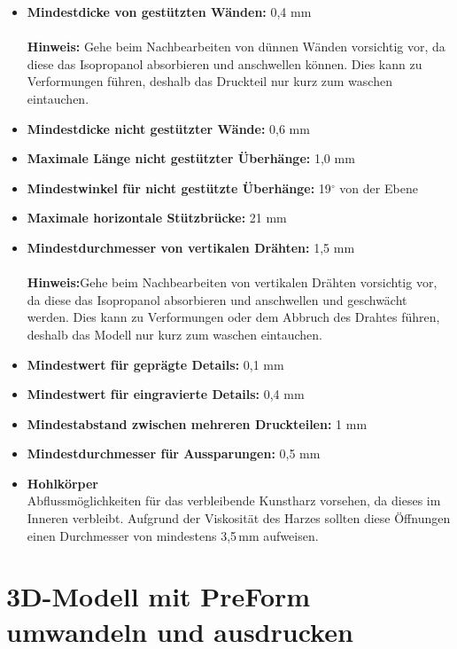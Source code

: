 \documentclass{\basedir/fablab-document}
\begin{document}
	\begin{itemize}
	\item \textbf{Mindestdicke von gestützten Wänden:}  0,4 mm\\
	\\
	\textbf{Hinweis:} Gehe beim Nachbearbeiten von dünnen Wänden vorsichtig vor, da diese das Isopropanol absorbieren und anschwellen können. Dies kann zu Verformungen führen, deshalb das Druckteil nur kurz zum waschen eintauchen. \\
	\item \textbf{Mindestdicke nicht gestützter Wände:}  0,6 mm
	\item \textbf{Maximale Länge nicht gestützter Überhänge:}  1,0 mm
	\item \textbf{Mindestwinkel für nicht gestützte Überhänge:}  19$^\circ$ von der Ebene
	\item \textbf{Maximale horizontale Stützbrücke:}  21 mm
	\item \textbf{Mindestdurchmesser von vertikalen Drähten:}  1,5 mm \\
	\\
	\textbf{Hinweis:}Gehe beim Nachbearbeiten von vertikalen Drähten vorsichtig vor, da diese das Isopropanol absorbieren und anschwellen und geschwächt werden. Dies kann zu Verformungen oder dem Abbruch des Drahtes führen, deshalb das Modell nur kurz zum waschen eintauchen. \\
	\item \textbf{Mindestwert für geprägte Details:}  0,1 mm
	\item \textbf{Mindestwert für eingravierte Details:}  0,4 mm
	\item \textbf{Mindestabstand zwischen mehreren Druckteilen:}  1 mm
	\item \textbf{Mindestdurchmesser für Aussparungen:}  0,5 mm
	\item \textbf{Hohlkörper} \\
	Abflussmöglichkeiten für das verbleibende Kunstharz vorsehen, da dieses im Inneren verbleibt. Aufgrund der Viskosität des Harzes sollten diese Öffnungen einen Durchmesser von mindestens 3,5\,mm aufweisen.
	
\end{itemize}


	\newpage
	


\section{3D-Modell mit PreForm umwandeln und ausdrucken}
 
\end{document}
